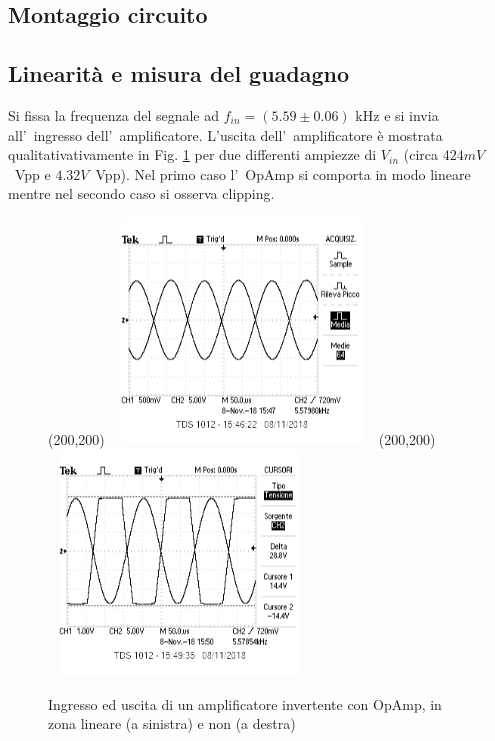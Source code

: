 \documentclass[10pt,a4paper]{article}
\begin{document}
\subsection{Montaggio circuito}

\subsection{Linearit\`a e misura del guadagno}
Si fissa la frequenza del segnale ad $f_{in} = (5.59 \pm 0.06)$ kHz e si invia all'~ingresso dell'~amplificatore.
L'uscita dell'~amplificatore \`e mostrata qualitativativamente in Fig. \ref{fig:oscinv} per due 
differenti ampiezze di $V_{in}$ (circa $424mV$~Vpp e $4.32V$~Vpp). 
Nel primo caso l'~OpAmp si comporta in modo lineare mentre nel secondo caso si osserva clipping.   
%
\begin{figure}[h]
\begin{center}
\framebox(200,200){
	\includegraphics[width=7cm,height=6cm]{screenshot/foto1.png}
}
\framebox(200,200){
	\includegraphics[width=7cm,height=6cm]{screenshot/foto2.png}
}
\end{center}
\caption{\small Ingresso ed uscita di un amplificatore invertente con OpAmp, in 
zona lineare (a sinistra) e non (a destra)}
\label{fig:oscinv}
\end{figure}
%
\end{document}
